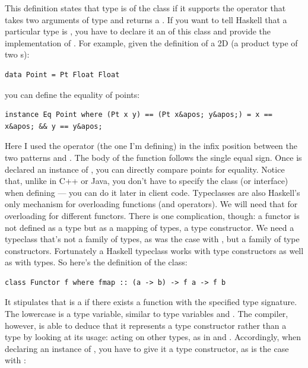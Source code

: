 This definition states that type  is of the class 
if it supports the operator \code{(==)} that takes two arguments of
type  and returns a . If you want to tell Haskell
that a particular type is , you have to declare it an
 of this class and provide the implementation of
\code{(==)}. For example, given the definition of a 2D 
(a product type of two s):

\begin{verbatim}
data Point = Pt Float Float
\end{verbatim}

you can define the equality of points:

\begin{verbatim}
instance Eq Point where (Pt x y) == (Pt x&apos; y&apos;) = x == x&apos; && y == y&apos;
\end{verbatim}

Here I used the operator \code{(==)} (the one I'm defining) in the
infix position between the two patterns  and
. The body of the function follows the
single equal sign. Once  is declared an instance of
, you can directly compare points for equality. Notice that,
unlike in C++ or Java, you don't have to specify the  class
(or interface) when defining  --- you can do it later in
client code. Typeclasses are also Haskell's only mechanism for
overloading functions (and operators). We will need that for overloading
 for different functors. There is one complication, though:
a functor is not defined as a type but as a mapping of types, a type
constructor. We need a typeclass that's not a family of types, as was
the case with , but a family of type constructors.
Fortunately a Haskell typeclass works with type constructors as well as
with types. So here's the definition of the  class:

\begin{verbatim}
class Functor f where fmap :: (a -> b) -> f a -> f b
\end{verbatim}

It stipulates that  is a  if there exists a
function  with the specified type signature. The lowercase
 is a type variable, similar to type variables  and
. The compiler, however, is able to deduce that it represents
a type constructor rather than a type by looking at its usage: acting on
other types, as in  and . Accordingly, when
declaring an instance of , you have to give it a type
constructor, as is the case with :

